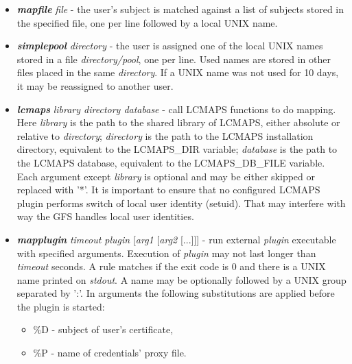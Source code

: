 \documentclass{article}
\begin{document}
\begin{itemize}
\begin{itemize}
\item \textbf{\textit{mapfile}} \textit{file} - the user's subject is
  matched against a list of subjects stored in the specified file, one
  per line followed by a local UNIX name.
\item \textbf{\textit{simplepool}} \textit{directory} - the user is
  assigned one of the local UNIX names stored in a file
  \textit{directory/pool}, one per line. Used names are stored in
  other files placed in the same \textit{directory}. If a UNIX name
  was not used for 10 days, it may be reassigned to another user.
\item \textbf{\textit{lcmaps}} \textit{library directory database} -
  call LCMAPS functions to do mapping. Here \textit{library} is the
  path to the shared library of LCMAPS, either absolute or relative to
  \textit{directory}; \textit{directory} is the path to the LCMAPS
  installation directory, equivalent to the LCMAPS\_DIR variable;
  \textit{database} is the path to the LCMAPS database, equivalent to
  the LCMAPS\_DB\_FILE variable. Each argument except \textit{library}
  is optional and may be either skipped or replaced with '{*}'. It is
  important to ensure that no configured LCMAPS plugin performs switch
  of local user identity (setuid). That may interfere with way the GFS
  handles local user identities.
\item \textbf{\textit{mapplugin}} \textit{timeout plugin}
  {[}\textit{arg1} {[}\textit{arg2} {[}...]]] - run external
  \emph{plugin} executable with specified arguments. Execution of
  \emph{plugin} may not last longer than \emph{timeout} seconds. A
  rule matches if the exit code is 0 and there is a UNIX name printed
  on \emph{stdout}. A name may be optionally followed by a UNIX group
  separated by ':'. In arguments the following substitutions are
  applied before the plugin is started:

\begin{itemize}
\item \%D - subject of user's certificate,
\item \%P - name of credentials' proxy file.
\end{itemize}

\end{itemize}


\end{itemize}
\end{document}

